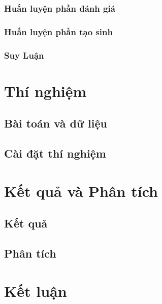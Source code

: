 \documentclass{article}
\begin{document}
\subsubsection{Huấn luyện phần đánh giá}

\subsubsection{Huấn luyện phần tạo sinh}

\subsubsection{Suy Luận}

\section{Thí nghiệm}

\subsection{Bài toán và dữ liệu}

\subsection{Cài đặt thí nghiệm}

\section{Kết quả và Phân tích} \label{sec:ketqua}

\subsection{Kết quả}

\subsection{Phân tích}

\section{Kết luận}


\printbibliography
\end{document}
